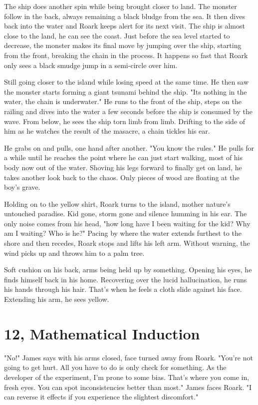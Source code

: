         The ship does another spin while being brought closer to land. The monster follow in the back, always remaining a black bludge from
    the sea. It then dives back into the water and Roark keeps alert for its next visit. The ship is almost close to the land, he can see the
    coast. Just before the sea level started to decrease, the monster makes its final move by jumping over the ship, starting from the front,
    breaking the chain in the process. It happens so fast that Roark only sees a black smudge jump in a semi-circle over him. 

        Still going closer to the island while losing speed at the same time. He then saw the monster starts forming a giant tsunami behind
    the ship. "Its nothing in the water, the chain is underwater." He runs to the front of the ship, steps on the railing and dives into the 
    water a few seconds before the ship is consumed by the wave. From below, he sees the ship torn limb from limb. Drifting to the side of
    him as he watches the result of the masacre, a chain tickles his ear.

        He grabs on and pulls, one hand after another. "You know the rules." He pulls for a while until he reaches the point where he can just
    start walking, most of his body now out of the water. Shoving his legs forward to finally get on land, he takes another look back to the
    chaos. Only pieces of wood are floating at the boy's grave.

        Holding on to the yellow shirt, Roark turns to the island, mother nature's untouched paradise. Kid gone, storm gone and silence humming
    in his ear. The only noise comes from his head, "how long have I been waiting for the kid? Why am I waiting? Who is he?" Pacing by where
    the water extends furthest to the shore and then recedes, Roark stops and lifts his left arm. Without warning, the wind picks up and throws
    him to a palm tree.

        Soft cushion on his back, arms being held up by something. Opening his eyes, he finds himself back in his home. Recovering over the
    lucid hallucination, he runs his hands through his hair. That's when he feels a cloth slide against his face. Extending his arm, he sees
    yellow.

\section{12, Mathematical Induction}

        "No!" James says with his arms closed, face turned away from Roark. "You're not going to get hurt. All you have to do is only check 
    for something. As the developer of the experiment, I'm prone to some bias. That's where you come in, fresh eyes. You can spot inconsistencies
    better than most." James faces Roark. "I can reverse it effects if you experience the slightest discomfort."

